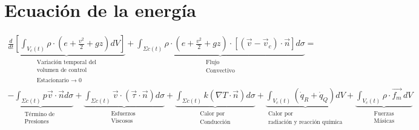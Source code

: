 \documentclass[10pt,a4paper]{article}
\begin{document}
\section{Ecuación de la energía}
\begin{center}
    \begin{tcolorbox}[colback=yellow!40!white, colframe=red!50!black,title=Ecuación de la energía]
\begin{equation*}
\begin{split}
\underbrace{\frac{d}{dt}\left[\int_{V_c(t)} \rho \cdot\left(e+\frac{v^{2}}{2}+g z\right) d V\right]}_{\substack{\text{Variación temporal del} \\ \text{volumen de control} \\ \text{} \\ \text{Estacionario $\xrightarrow{}$ 0}}}+\underbrace{\int_{\Sigma c(t)} \rho \cdot\left(e+\frac{v^{2}}{2}+g z\right) \cdot\left[\left(\vec{v}-\vec{v}_{c}\right) \cdot \vec{n}\right] d \sigma}_{\substack{{\text {Flujo }} \\ {\text{Convectivo}}}}= \\ \underbrace{-\int_{\Sigma c(t)} p \vec{v} \cdot \vec{n} d \sigma}_{\substack{\text{Término de } \\  {\text{Presiones}}}} +\underbrace{\int_{\Sigma c(t)} \vec{v} \cdot(\vec{\tau} \cdot \vec{n}) d \sigma}_{\substack{\text{Esfuerzos } \\  {\text{Viscosos}}}}+\underbrace{\int_{\Sigma c(t)} k(\nabla T \cdot \vec{n}) d \sigma}_{\substack{\text{Calor por } \\  {\text{Conducción}}}}+\underbrace{\int_{V_c(t)}\left(\dot{q}_{R}+\dot{q}_{Q}\right) d V}_{\substack{\text{Calor por } \\  {\text{radiación y reacción química}}}} + \underbrace{\int_{V_c(t)}^{}\rho \cdot \vec{f_m} \, dV}_{\substack{\text{Fuerzas} \\  {\text{Másicas}}}}
\end{split}
\end{equation*}
    \end{tcolorbox}
\end{center}
\end{document}
